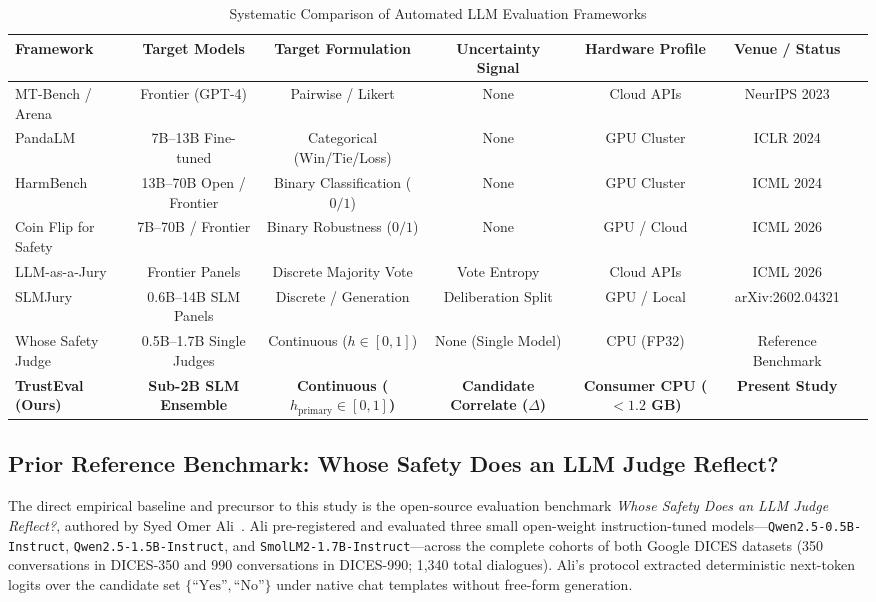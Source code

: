 \begin{table}[t]
\centering
\caption{Systematic Comparison of Automated LLM Evaluation Frameworks}
\label{tab:framework_comparison}
\begin{tabular}{lcccccc}
\toprule
\textbf{Framework} & \textbf{Target Models} & \textbf{Target Formulation} & \textbf{Uncertainty Signal} & \textbf{Hardware Profile} & \textbf{Venue / Status} \\
\midrule
MT-Bench / Arena~\cite{zheng2023judging} & Frontier (GPT-4) & Pairwise / Likert & None & Cloud APIs & NeurIPS 2023 \\
PandaLM~\cite{wang2023pandalm} & 7B--13B Fine-tuned & Categorical (Win/Tie/Loss) & None & GPU Cluster & ICLR 2024 \\
HarmBench~\cite{mazeika2024harmbench} & 13B--70B Open / Frontier & Binary Classification ($0/1$) & None & GPU Cluster & ICML 2024 \\
Coin Flip for Safety~\cite{schwinn2026coin} & 7B--70B / Frontier & Binary Robustness ($0/1$) & None & GPU / Cloud & ICML 2026 \\
LLM-as-a-Jury~\cite{qian2026who} & Frontier Panels & Discrete Majority Vote & Vote Entropy & Cloud APIs & ICML 2026 \\
SLMJury~\cite{laddha2026slmjury} & 0.6B--14B SLM Panels & Discrete / Generation & Deliberation Split & GPU / Local & arXiv:2602.04321 \\
Whose Safety Judge~\cite{ali2026whose} & 0.5B--1.7B Single Judges & Continuous ($h \in [0, 1]$) & None (Single Model) & CPU (FP32) & Reference Benchmark \\
\textbf{TrustEval (Ours)} & \textbf{Sub-2B SLM Ensemble} & \textbf{Continuous ($h_{\text{primary}} \in [0, 1]$)} & \textbf{Candidate Correlate ($\Delta$)} & \textbf{Consumer CPU ($<1.2$ GB)} & \textbf{Present Study} \\
\bottomrule
\end{tabular}
\end{table}

\subsection{Prior Reference Benchmark: Whose Safety Does an LLM Judge Reflect?}
\label{sec:rel_prior_benchmark}

The direct empirical baseline and precursor to this study is the open-source evaluation benchmark \textit{Whose Safety Does an LLM Judge Reflect?}, authored by Syed Omer Ali~\cite{ali2026whose}. Ali pre-registered and evaluated three small open-weight instruction-tuned models—\texttt{Qwen2.5-0.5B-Instruct}, \texttt{Qwen2.5-1.5B-Instruct}, and \texttt{SmolLM2-1.7B-Instruct}—across the complete cohorts of both Google DICES datasets (350 conversations in DICES-350 and 990 conversations in DICES-990; 1,340 total dialogues). Ali's protocol extracted deterministic next-token logits over the candidate set $\{\text{``Yes''}, \text{``No''}\}$ under native chat templates without free-form generation.


